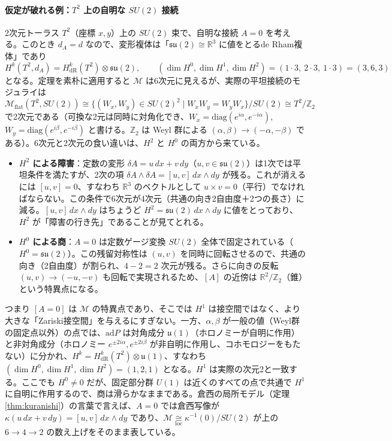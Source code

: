 \documentclass[uplatex, dvipdfmx, book]{jsbook}
\begin{document}
\paragraph{仮定が破れる例：$T^2$ 上の自明な $SU(2)$ 接続}
2次元トーラス $T^2$（座標 $x, y$）上の $SU(2)$ 束で、自明な接続 $A = 0$ を考える。このとき $d_A = d$ なので、変形複体は「$\mathfrak{su}(2) \cong \mathbb{R}^3$ に値をとるde Rham複体」であり
\begin{equation*}
    H^k(T^2, d_A) = H^k_{\mathrm{dR}}(T^2) \otimes \mathfrak{su}(2), \qquad
    (\dim H^0, \dim H^1, \dim H^2) = (1\cdot 3,\ 2\cdot 3,\ 1\cdot 3) = (3, 6, 3)
\end{equation*}
となる。定理を素朴に適用すると $\mathcal{M}$ は6次元に見えるが、実際の平坦接続のモジュライは
\begin{equation*}
    \mathcal{M}_{\text{flat}}(T^2, SU(2)) \cong \{(W_x, W_y) \in SU(2)^2 \mid W_xW_y = W_yW_x\}/SU(2) \cong T^2/\mathbb{Z}_2
\end{equation*}
で2次元である（可換な2元は同時に対角化でき、$W_x = \mathrm{diag}(e^{i\alpha}, e^{-i\alpha})$, $W_y = \mathrm{diag}(e^{i\beta}, e^{-i\beta})$ と書ける。$\mathbb{Z}_2$ は Weyl 群による $(\alpha, \beta) \to (-\alpha, -\beta)$ である）。6次元と2次元の食い違いは、$H^2$ と $H^0$ の両方から来ている。
\begin{itemize}
    \item \textbf{$H^2$ による障害}：定数の変形 $\delta A = u\,dx + v\,dy$（$u, v \in \mathfrak{su}(2)$）は1次では平坦条件を満たすが、2次の項 $\delta A \wedge \delta A = [u, v]\,dx\wedge dy$ が残る。これが消えるには $[u, v] = 0$、すなわち $\mathbb{R}^3$ のベクトルとして $u \times v = 0$（平行）でなければならない。この条件で6次元が4次元（共通の向き2自由度＋2つの長さ）に減る。$[u,v]\,dx\wedge dy$ はちょうど $H^2 = \mathfrak{su}(2)\,dx\wedge dy$ に値をとっており、$H^2$ が「障害の行き先」であることが見てとれる。
    \item \textbf{$H^0$ による商}：$A = 0$ は定数ゲージ変換 $SU(2)$ 全体で固定されている（$H^0 = \mathfrak{su}(2)$）。この残留対称性は $(u, v)$ を同時に回転させるので、共通の向き（2自由度）が割られ、$4 - 2 = 2$ 次元が残る。さらに向きの反転 $(u,v) \to (-u,-v)$ も回転で実現されるため、$[A]$ の近傍は $\mathbb{R}^2/\mathbb{Z}_2$（錐）という特異点になる。
\end{itemize}
つまり $[A = 0]$ は $\mathcal{M}$ の特異点であり、そこでは $H^1$ は接空間ではなく、より大きな「Zariski接空間」を与えるにすぎない。一方、$\alpha, \beta$ が一般の値（Weyl群の固定点以外）の点では、$\mathrm{ad}P$ は対角成分 $\mathfrak{u}(1)$（ホロノミーが自明に作用）と非対角成分（ホロノミー $e^{\pm 2i\alpha}, e^{\pm 2i\beta}$ が非自明に作用し、コホモロジーをもたない）に分かれ、$H^k = H^k_{\mathrm{dR}}(T^2)\otimes\mathfrak{u}(1)$、すなわち $(\dim H^0, \dim H^1, \dim H^2) = (1, 2, 1)$ となる。$H^1$ は実際の次元2と一致する。ここでも $H^0 \neq 0$ だが、固定部分群 $U(1)$ は近くのすべての点で共通で $H^1$ に自明に作用するので、商は滑らかなままである。倉西の局所モデル（定理\ref{thm:kuranishi}）の言葉で言えば、$A = 0$ では倉西写像が $\kappa(u\,dx + v\,dy) = [u, v]\,dx\wedge dy$ であり、$\mathcal{M} \underset{\text{loc}}{\cong} \kappa^{-1}(0)/SU(2)$ が上の $6 \to 4 \to 2$ の数え上げをそのまま表している。
\end{document}
